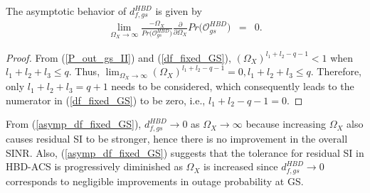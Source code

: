 \begin{corollary} 
The asymptotic behavior of $d_{f,gs}^{HBD}$ is given by
\begin{eqnarray} \label{asymp_df_fixed_GS}
\lim_{\Omega_X\to\infty} \frac{-\Omega_X}{Pr\big(\mathcal{O}_{gs}^{HBD}\big)}\frac{\partial}{\partial\Omega_X}Pr\big(\mathcal{O}_{gs}^{HBD}\big) & = & 0.
\end{eqnarray}
\end{corollary}
\begin{proof}
From (\ref{P_out_gs_II}) and (\ref{df_fixed_GS}), $\left(\Omega_X\right)^{l_1+l_2-q-1} < 1$ when $l_1 + l_2 + l_3 \leq q$. Thus, $\lim_{\Omega_X\to\infty} \left(\Omega_X\right)^{l_1+l_2-q-1} = 0, l_1 + l_2 + l_3 \leq q$. Therefore, only $l_1 + l_2  + l_3 = q + 1$ needs to be considered, which consequently leads to the numerator in (\ref{df_fixed_GS}) to be zero, i.e., $l_1 + l_2 - q - 1 = 0$.
\end{proof}


From (\ref{asymp_df_fixed_GS}), $d_{f,gs}^{HBD} \to 0$ as $\Omega_X \to \infty$ because increasing $\Omega_X$ also causes residual SI to be stronger, hence there is no improvement in the overall SINR. Also, (\ref{asymp_df_fixed_GS}) suggests that the tolerance for residual SI in HBD-ACS is progressively diminished as $\Omega_X$ is increased since $d_{f,gs}^{HBD} \to 0$ corresponds to negligible improvements in outage probability at GS.


